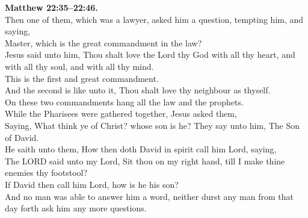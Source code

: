 \documentclass[10pt]{article} %
\begin{document}
{\begin{minipage}[t]{0.45\textwidth}
\textbf{Matthew 22:35--22:46.}\\
Then one of them, which was a lawyer, asked him a question, tempting him, and saying,\\
Master, which is the great commandment in the law?\\
Jesus said unto him, Thou shalt love the Lord thy God with all thy heart, and with all thy soul, and with all thy mind.\\
This is the first and great commandment.\\
And the second is like unto it, Thou shalt love thy neighbour as thyself.\\
On these two commandments hang all the law and the prophets.\\
While the Pharisees were gathered together, Jesus asked them,\\
Saying, What think ye of Christ? whose son is he? They say unto him, The Son of David.\\
He saith unto them, How then doth David in spirit call him Lord, saying,\\
The LORD said unto my Lord, Sit thou on my right hand, till I make thine enemies thy footstool?\\
If David then call him Lord, how is he his son?\\
And no man was able to answer him a word, neither durst any man from that day forth ask him any more questions.\\
\end{minipage}}
\vspace*{\fill}
\newpage
\Huge%
\vspace*{\fill}
\begin{spacing}{1.0}
\end{spacing}
\vspace*{\fill}
\end{document}
